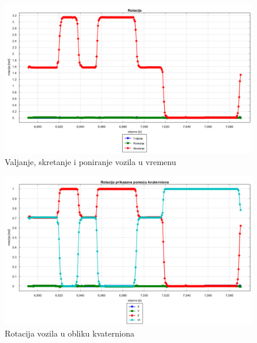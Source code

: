 \begin{figure}[H]
  \includegraphics[scale=0.4]{images/rotacija_vrijeme1.png}
  \caption{Valjanje, skretanje i poniranje vozila u vremenu}
  \label{fig:gt1_rot_vr}
\end{figure}
\begin{figure}[H]
  \includegraphics[scale=0.4]{images/rotacija_kvaterni1.png}
  \caption{Rotacija vozila u obliku kvaterniona}
  \label{fig:gt1_rot_kv}
\end{figure}

\newpage
